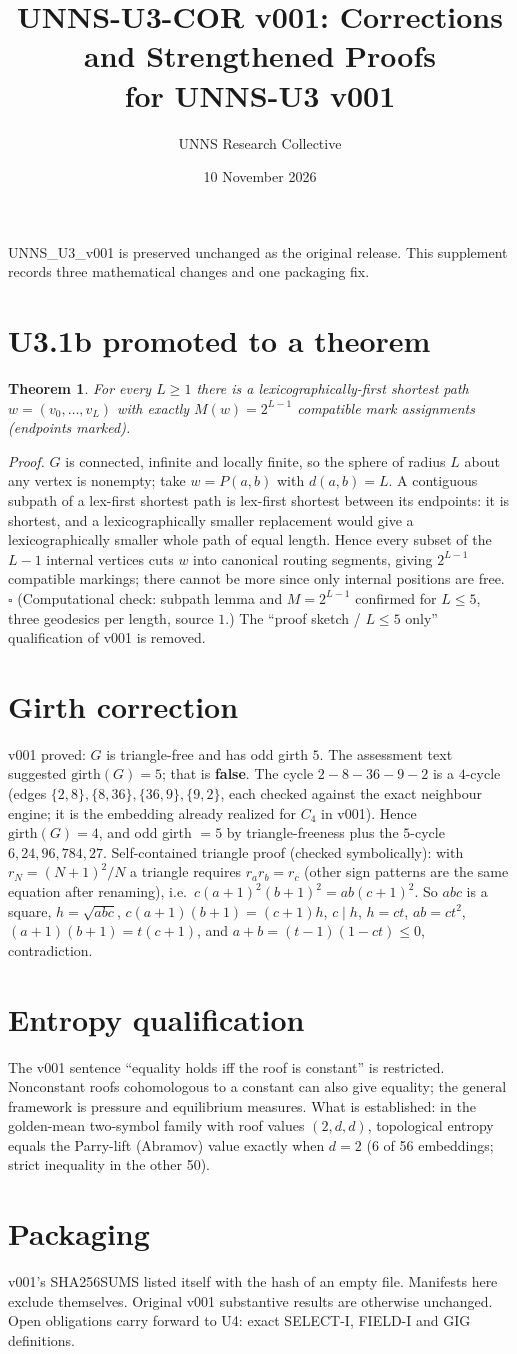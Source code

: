 \documentclass[11pt]{article}\usepackage[margin=1in]{geometry}\usepackage{amsmath,amssymb,amsthm}
\newtheorem{thm}{Theorem}\title{UNNS-U3-COR v001: Corrections and Strengthened Proofs\\for UNNS-U3 v001}\author{UNNS Research Collective}\date{10 November 2026}
\begin{document}
\maketitle
UNNS\_U3\_v001 is preserved unchanged as the original release. This supplement records three mathematical changes and one packaging fix.
\section{U3.1b promoted to a theorem}
\begin{thm}For every $L\ge1$ there is a lexicographically-first shortest path $w=(v_0,\dots,v_L)$ with exactly $M(w)=2^{L-1}$ compatible mark assignments (endpoints marked).\end{thm}
\emph{Proof.} $G$ is connected, infinite and locally finite, so the sphere of radius $L$ about any vertex is nonempty; take $w=P(a,b)$ with $d(a,b)=L$. A contiguous subpath of a lex-first shortest path is lex-first shortest between its endpoints: it is shortest, and a lexicographically smaller replacement would give a lexicographically smaller whole path of equal length. Hence every subset of the $L-1$ internal vertices cuts $w$ into canonical routing segments, giving $2^{L-1}$ compatible markings; there cannot be more since only internal positions are free. $\square$ (Computational check: subpath lemma and $M=2^{L-1}$ confirmed for $L\le5$, three geodesics per length, source $1$.) The ``proof sketch / $L\le5$ only'' qualification of v001 is removed.
\section{Girth correction}
v001 proved: $G$ is triangle-free and has odd girth $5$. The assessment text suggested $\mathrm{girth}(G)=5$; that is \textbf{false}. The cycle $2\!-\!8\!-\!36\!-\!9\!-\!2$ is a $4$-cycle (edges $\{2,8\},\{8,36\},\{36,9\},\{9,2\}$, each checked against the exact neighbour engine; it is the embedding already realized for $C_4$ in v001). Hence $\mathrm{girth}(G)=4$, and odd girth $=5$ by triangle-freeness plus the $5$-cycle $6,24,96,784,27$.
Self-contained triangle proof (checked symbolically): with $r_N=(N+1)^2/N$ a triangle requires $r_ar_b=r_c$ (other sign patterns are the same equation after renaming), i.e.\ $c(a+1)^2(b+1)^2=ab(c+1)^2$. So $abc$ is a square, $h=\sqrt{abc}$, $c(a+1)(b+1)=(c+1)h$, $c\mid h$, $h=ct$, $ab=ct^2$, $(a+1)(b+1)=t(c+1)$, and $a+b=(t-1)(1-ct)\le0$, contradiction.
\section{Entropy qualification}
The v001 sentence ``equality holds iff the roof is constant'' is restricted. Nonconstant roofs cohomologous to a constant can also give equality; the general framework is pressure and equilibrium measures. What is established: in the golden-mean two-symbol family with roof values $(2,d,d)$, topological entropy equals the Parry-lift (Abramov) value exactly when $d=2$ (6 of 56 embeddings; strict inequality in the other 50).
\section{Packaging}
v001's SHA256SUMS listed itself with the hash of an empty file. Manifests here exclude themselves. Original v001 substantive results are otherwise unchanged. Open obligations carry forward to U4: exact SELECT-I, FIELD-I and GIG definitions.
\end{document}
